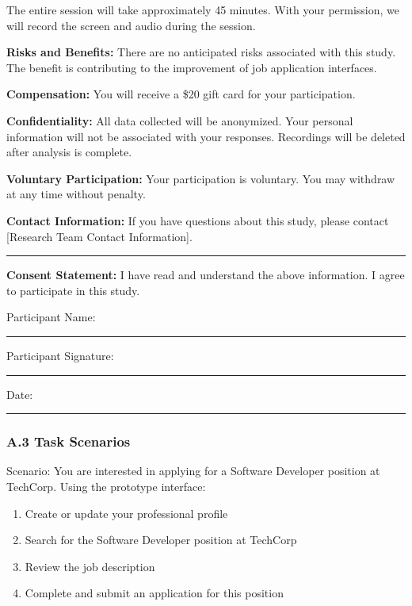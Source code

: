 \documentclass[
	letterpaper, %
]{jdf}
\begin{document}
\begin{sloppypar}
The entire session will take approximately 45 minutes. With your permission, we will record the screen and audio during the session.

\textbf{Risks and Benefits:} There are no anticipated risks associated with this study. The benefit is contributing to the improvement of job application interfaces.

\textbf{Compensation:} You will receive a \$20 gift card for your participation.

\textbf{Confidentiality:} All data collected will be anonymized. Your personal information will not be associated with your responses. Recordings will be deleted after analysis is complete.

\textbf{Voluntary Participation:} Your participation is voluntary. You may withdraw at any time without penalty.

\textbf{Contact Information:} If you have questions about this study, please contact [Research Team Contact Information].

\vspace{0.5cm}
\rule{8cm}{0.5pt}

\textbf{Consent Statement:} I have read and understand the above information. I agree to participate in this study.

\vspace{0.5cm}
Participant Name: \rule{8cm}{0.5pt}

Participant Signature: \rule{8cm}{0.5pt}

Date: \rule{4cm}{0.5pt}

\subsubsection{A.3 Task Scenarios}


Scenario: You are interested in applying for a Software Developer position at TechCorp. Using the prototype interface:

\begin{enumerate}
    \item Create or update your professional profile
    \item Search for the Software Developer position at TechCorp
    \item Review the job description
    \item Complete and submit an application for this position
\end{enumerate}


\end{sloppypar}
\end{document}
